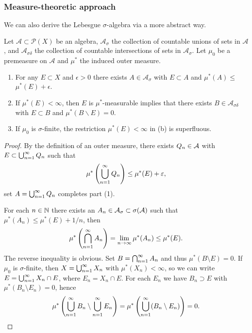\subsubsection*{Measure-theoretic approach}
We can also derive the Lebesgue $\sigma$-algebra via a more abstract way. 

\begin{exercise}\label{ex1-22}
    Let $\mathcal{A} \subset \mathcal{P}(X)$ be an algebra, $\mathcal{A}_\sigma$ the collection of countable unions of sets in $\mathcal{A}$, and $\mathcal{A}_{\sigma \delta}$ the collection of countable intersections of sets in $\mathcal{A}_\sigma$. Let $\mu_0$ be a premeasure on $\mathcal{A}$ and $\mu^*$ the induced outer measure.
    \begin{enumerate}
    \item For any $E \subset X$ and $\epsilon>0$ there exists $A \in \mathcal{A}_\sigma$ with $E \subset A$ and $\mu^*(A) \leq$ $\mu^*(E)+\epsilon$.
    \item If $\mu^*(E)<\infty$, then $E$ is $\mu^*$-measurable implies that there exists $B \in \mathcal{A}_{\sigma \delta}$ with $E \subset B$ and $\mu^*(B \backslash E)=0$.
    \item If $\mu_0$ is $\sigma$-finite, the restriction $\mu^*(E)<\infty$ in (b) is superfluous. 
    \end{enumerate}
\end{exercise}
\begin{proof}
    By the definition of an outer measure, there exists $Q_n \in \mathcal{A}$ with $E \subset \bigcup_{n=1}^{\infty}Q_n$ such that 
    $$\mu^*\left(\bigcup_{n=1}^{\infty}Q_n\right) \leq \mu^*(E) + \varepsilon, $$
    set $A = \bigcup_{n=1}^{\infty}Q_n$ completes part (1). 

    For each $n \in \mathbb{N}$ there exists an $A_n \in \mathcal{A}_\sigma \subset \sigma(\mathcal{A})$ such that 
    $\mu^*(A_n) \leq \mu^*(E) + 1/n$,
    then 
    $$\mu^*\left(\bigcap_{n=1}^{\infty}A_n\right)
    = \lim_{n \to \infty}\mu^*(A_n) \leq \mu^*(E).$$
    The reverse inequality is obvious. Set $B = \bigcap_{n=1}^{\infty}A_n$ and thus $\mu^*(B \setminus E) = 0$. 
    If $\mu_0$ is $\sigma$-finite, then $X = \bigcup_{n=1}^{\infty}X_n$ with $\mu^*(X_n) < \infty$, so we can write 
    $E = \bigcup_{n=1}^{\infty}X_n \cap E$, where $E_n = X_n \cap E$. For each $E_n$ we have $B_n \supset E$ with $\mu^*(B_n \setminus E_n) = 0$, hence 
    $$\mu^*\left(\bigcup_{n=1}^{\infty}B_n \setminus \bigcup_{n=1}^{\infty}E_n\right) = 
    \mu^*\left(\bigcup_{n=1}^{\infty}(B_n \setminus E_n)\right) = 0.$$
\end{proof}

